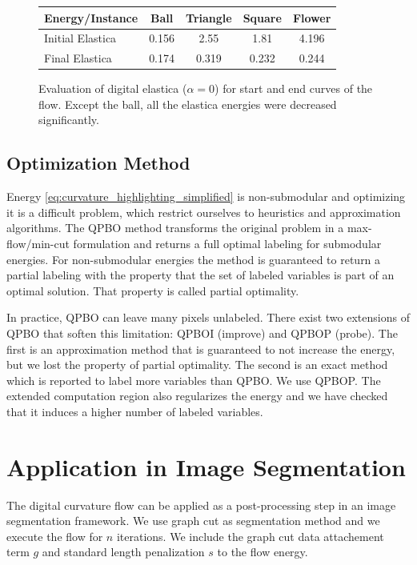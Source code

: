 \documentclass[runningheads]{llncs}
\begin{document}
\begin{figure}[!ht]
\center
\begin{tabular}{l|c|c|c|c}
	Energy/Instance & Ball & Triangle & Square & Flower\\
	\hline
	Initial Elastica & 0.156 & 2.55 & 1.81 & 4.196 \\
	Final Elastica & 0.174 & 0.319 & 0.232 & 0.244
\end{tabular}
\caption{Evaluation of digital elastica ($\alpha=0$) for start and end curves of the flow. Except the ball, all the elastica energies were decreased significantly.}
\label{tab:digital_glows_elastica_result}
\end{figure}

\subsection{Optimization Method}\label{sec:optimization_method}

	Energy \eqref{eq:curvature_highlighting_simplified} is non-submodular and optimizing it is a difficult problem, which restrict ourselves to heuristics and approximation algorithms. The QPBO method \cite{kolmogorov07} transforms the original problem in a max-flow/min-cut formulation and returns a full optimal labeling for submodular energies. For non-submodular energies the method is guaranteed to return a partial labeling with the property that the set of labeled variables is part of an optimal solution. That property is called partial optimality. 

	In practice, QPBO can leave many pixels unlabeled. There exist two extensions of QPBO that soften this limitation: QPBOI (improve) and QPBOP (probe). The first is an approximation method that is guaranteed to not increase the energy, but we lost the property of partial optimality. The second is an exact method which is reported to label more variables than QPBO. We use QPBOP. The extended computation region also regularizes the energy and we have checked that it induces a higher number of labeled variables.
	
\section{Application in Image Segmentation}

The digital curvature flow can be applied as a post-processing step in an image segmentation framework. We use graph cut \cite{boykov01} as segmentation method and we execute the flow for $n$ iterations. We include the graph cut data attachement term $g$ and standard length penalization $s$ to the flow energy.
\end{document}

